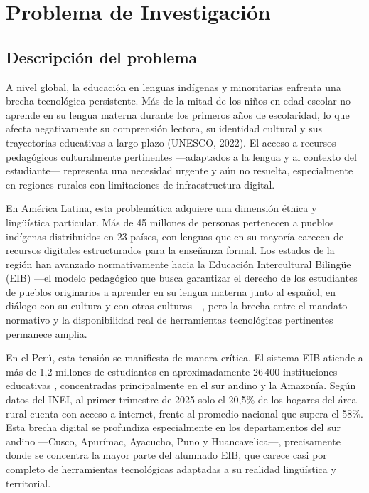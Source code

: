 \newpage


\section{Problema de Investigación}
\subsection{Descripción del problema}

A nivel global, la educación en lenguas indígenas y minoritarias enfrenta una brecha tecnológica persistente. Más de la mitad de los niños en edad escolar no aprende en su lengua materna durante los primeros años de escolaridad, lo que afecta negativamente su comprensión lectora, su identidad cultural y sus trayectorias educativas a largo plazo (UNESCO, 2022). El acceso a recursos pedagógicos culturalmente pertinentes —adaptados a la lengua y al contexto del estudiante— representa una necesidad urgente y aún no resuelta, especialmente en regiones rurales con limitaciones de infraestructura digital.

En América Latina, esta problemática adquiere una dimensión étnica y lingüística particular. Más de 45 millones de personas pertenecen a pueblos indígenas distribuidos en 23 países, con lenguas que en su mayoría carecen de recursos digitales estructurados para la enseñanza formal. Los estados de la región han avanzado normativamente hacia la Educación Intercultural Bilingüe (EIB) —el modelo pedagógico que busca garantizar el derecho de los estudiantes de pueblos originarios a aprender en su lengua materna junto al español, en diálogo con su cultura y con otras culturas—, pero la brecha entre el mandato normativo y la disponibilidad real de herramientas tecnológicas pertinentes permanece amplia.

En el Perú, esta tensión se manifiesta de manera crítica. El sistema EIB atiende a más de 1,2 millones de estudiantes en aproximadamente 26\,400 instituciones educativas \citep{minedu2018}, concentradas principalmente en el sur andino y la Amazonía. Según datos del INEI, al primer trimestre de 2025 solo el 20,5\% de los hogares del área rural cuenta con acceso a internet, frente al promedio nacional que supera el 58\%. Esta brecha digital se profundiza especialmente en los departamentos del sur andino —Cusco, Apurímac, Ayacucho, Puno y Huancavelica—, precisamente donde se concentra la mayor parte del alumnado EIB, que carece casi por completo de herramientas tecnológicas adaptadas a su realidad lingüística y territorial.

